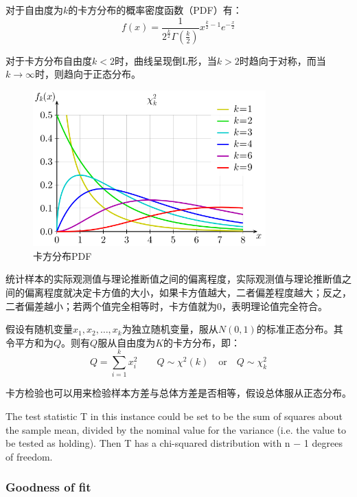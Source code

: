 \documentclass[11pt]{article}
\begin{document}
对于自由度为$k$的卡方分布的概率密度函数（PDF）有：
\begin{equation*}
    f(x) = \frac{1}{2^{\frac{k}{2}}\Gamma\left(\frac{k}{2}\right)} x^{\frac{k}{2}-1} e^{-\frac{x}{2}}
\end{equation*}

对于卡方分布自由度$k<2$时，曲线呈现倒L形，当$k>2$时趋向于对称，而当$k\rightarrow \infty$时，则趋向于正态分布。
\begin{figure}[ht!]
    \centering
    \includegraphics[width=0.8\textwidth]{fig/chi-squared.png}
    \caption{卡方分布PDF}
    \label{fig:chi-squared}
\end{figure}


统计样本的实际观测值与理论推断值之间的偏离程度，实际观测值与理论推断值之间的偏离程度就决定卡方值的大小，如果卡方值越大，二者偏差程度越大；反之，二者偏差越小；若两个值完全相等时，卡方值就为0，表明理论值完全符合。


假设有随机变量$x_1,x_2,\dots,x_k$为独立随机变量，服从$N(0,1)$的标准正态分布。其令平方和为$Q$。则有$Q$服从自由度为$K$的卡方分布，即：
\begin{equation*}
    Q = \sum_{i=1}^{k} x_i^2 \qquad Q \sim \chi^2(k) \quad\text{or}\quad Q \sim \chi_k^2
\end{equation*}

卡方检验也可以用来检验样本方差与总体方差是否相等，假设总体服从正态分布。

 The test statistic T in this instance could be set to be the sum of squares about the sample mean, divided by the nominal value for the variance (i.e. the value to be tested as holding). Then T has a chi-squared distribution with n − 1 degrees of freedom. 


\subsubsection{Goodness of fit}
\end{document}
